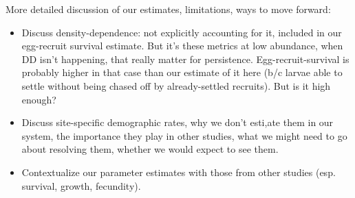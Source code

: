 \documentclass[12pt, oneside]{article}   	%
\begin{document}
More detailed discussion of our estimates, limitations, ways to move forward:
\begin{itemize}
	\item Discuss density-dependence: not explicitly accounting for it, included in our egg-recruit survival estimate. But it's these metrics at low abundance, when DD isn't happening, that really matter for persistence. Egg-recruit-survival is probably higher in that case than our estimate of it here (b/c larvae able to settle without being chased off by already-settled recruits). But is it high enough?
	\item Discuss site-specific demographic rates, why we don't esti,ate them in our system, the importance they play in other studies, what we might need to go about resolving them, whether we would expect to see them.
	\item Contextualize our parameter estimates with those from other studies (esp. survival, growth, fecundity).

\end{itemize}
\end{document}
